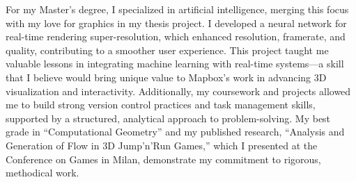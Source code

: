 For my Master’s degree, 
I specialized in artificial intelligence, 
merging this focus with my love for graphics in my thesis project. 
I developed a neural network for real-time rendering super-resolution, 
which enhanced resolution, framerate, and quality, contributing to a smoother user experience. 
This project taught me valuable lessons in integrating machine learning with 
real-time systems—a skill that I believe would bring unique value to Mapbox’s work in 
advancing 3D visualization and interactivity. 
Additionally, my coursework and projects allowed me to build strong version control practices 
and task management skills, supported by a structured, analytical approach to problem-solving. 
My best grade in “Computational Geometry” and my published research, 
“Analysis and Generation of Flow in 3D Jump’n’Run Games,” 
which I presented at the Conference on Games in Milan, 
demonstrate my commitment to rigorous, methodical work.
